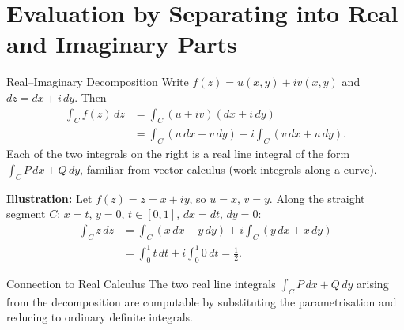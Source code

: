 \documentclass[12pt,a4paper]{article}
\begin{document}
\section{Evaluation by Separating into Real and Imaginary Parts}
\begin{infobox}{Real--Imaginary Decomposition}
Write $f(z) = u(x,y) + iv(x,y)$ and $dz = dx + i\,dy$. Then
\begin{align*}
  \int_C f(z)\,dz
  &= \int_C (u + iv)(dx + i\,dy) \\
  &= \int_C (u\,dx - v\,dy) + i\int_C (v\,dx + u\,dy).
\end{align*}
Each of the two integrals on the right is a real line integral of the form
$\int_C P\,dx + Q\,dy$, familiar from vector calculus (work integrals along
a curve).
\end{infobox}

\textbf{Illustration:} Let $f(z) = z = x + iy$, so $u = x$, $v = y$.
Along the straight segment $C$: $x = t$, $y = 0$, $t \in [0,1]$,
$dx = dt$, $dy = 0$:
\begin{align*}
  \int_C z\,dz
  &= \int_C (x\,dx - y\,dy) + i\int_C (y\,dx + x\,dy) \\
  &= \int_0^1 t\,dt + i\int_0^1 0\,dt
   = \frac{1}{2}.
\end{align*}

\begin{learnbox}{Connection to Real Calculus}
The two real line integrals $\int_C P\,dx + Q\,dy$ arising from the
decomposition are computable by substituting the parametrisation and reducing
to ordinary definite integrals.
\end{learnbox}

\end{document}
